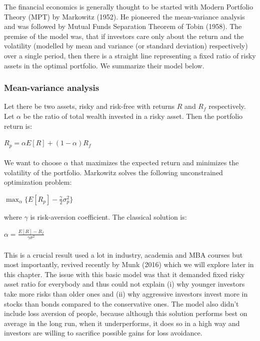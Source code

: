 \documentclass[]{article}
\begin{document}
The financial economics is generally thought to be started with Modern Portfolio Theory (MPT) by Markowitz (1952). He pioneered the mean-variance analysis and was followed by Mutual Funds Separation Theorem of Tobin (1958). The premise of the model was, that if investors care only about the return and the volatility (modelled by mean and variance (or standard deviation) respectively) over a single period, then there is a straight line representing a fixed ratio of risky assets in the optimal portfolio. We summarize their model below.

\subsubsection{Mean-variance analysis}
Let there be two assets, risky and risk-free with returns $R$ and $R_f$ respectively. Let $\alpha$ be the ratio of total wealth invested in a risky asset. Then the portfolio return is:

\begin{center}
  $R_p = \alpha E[R] + \left(1-\alpha \right) R_f$
\end{center}

\paragraph{}We want to choose $\alpha$ that maximizes the expected return and minimizes the volatility of the portfolio. Markowitz solves the following unconstrained optimization problem:

\begin{center}
  $\displaystyle\max_{\alpha} \{ E[R_p] - \frac{\gamma}{2}\sigma^2_p \}$
\end{center}

where $\gamma$ is risk-aversion coefficient. The classical solution is:

\begin{center}
	$\alpha = \frac{E[R] - R_f}{\gamma\sigma^2}$
\end{center}

\paragraph{}This is a crucial result used a lot in industry, academia and MBA courses but most importantly, revived recently by Munk (2016) which we will explore later in this chapter. The issue with this basic model was that it demanded fixed risky asset ratio for everybody and thus could not explain (i) why younger investors take more risks than older ones and (ii) why aggressive investors invest more in stocks than bonds compared to the conservative ones. The model also didn't include loss aversion of people, because although this solution performs best on average in the long run, when it underperforms, it does so in a high way and investors are willing to sacrifice possible gains for loss avoidance.
\end{document}
